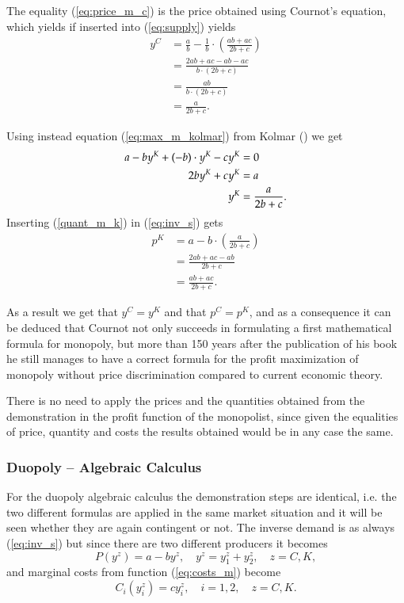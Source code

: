 \documentclass[12pt]{article}
\numberwithin{equation}{subsection}
\begin{document}
The equality (\ref{eq:price_m_c}) is the price obtained using Cournot's equation, which yields if inserted into (\ref{eq:supply}) yields \begin{align*}
y^C &= \frac{a}{b} - \frac{1}{b} \cdot \left(\frac{ab + ac}{2b + c}\right) \\
& = \frac{2ab + ac - ab - ac}{b \cdot (2b + c)} \\
& = \frac{ab}{b \cdot (2b + c)} \\
& = \frac{a}{2b + c}.
\end{align*}

Using instead equation (\ref{eq:max_m_kolmar}) from Kolmar (\citeyear{Kolmar_2022}) we get \begin{align}
\label{quant_m_k}
a - by^K + (-b) \cdot y^K - cy^K  & = 0 \notag \\
2by^K + cy^K & = a \notag \\
y^K &= \frac{a}{2b + c}.
\end{align} Inserting (\ref{quant_m_k}) in (\ref{eq:inv_s}) gets \begin{align*}
p^K  & = a - b \cdot \left(\frac{a}{2b + c}\right)\\
& = \frac{2ab + ac - ab}{2b + c}\\
& = \frac{ab + ac}{2b + c}.
\end{align*}

As a result we get that $y^C = y^K$ and that $p^C = p^K$, and as a consequence it can be deduced that Cournot not only succeeds in formulating a first mathematical formula for monopoly, but more than 150 years after the publication of his book he still manages to have a correct formula for the profit maximization of monopoly without price discrimination compared to current economic theory.

There is no need to apply the prices and the quantities obtained from the demonstration in the profit function of the monopolist, since given the equalities of price, quantity and costs the results obtained would be in any case the same.
\subsubsection{Duopoly -- Algebraic Calculus}
\label{sec:duopoly_c_k}
For the duopoly algebraic calculus the demonstration steps are identical, i.e. the two different formulas are  applied in the same market situation and it will be seen whether they are again contingent or not. The inverse demand is as always (\ref{eq:inv_s}) but since there are two different producers it becomes \begin{equation}
\label{eq:3.1.2_inv_s}
P(y^z) = a - by^z, \quad y^z = y^z_1 + y^z_2,\quad z = C, K,
\end{equation} and marginal costs from function (\ref{eq:costs_m}) become \begin{equation}
\label{eq:3.1.2_costs}
C_i(y^z_i) = cy^z_i, \quad i = 1, 2, \quad z = C, K.
\end{equation}
\end{document}
